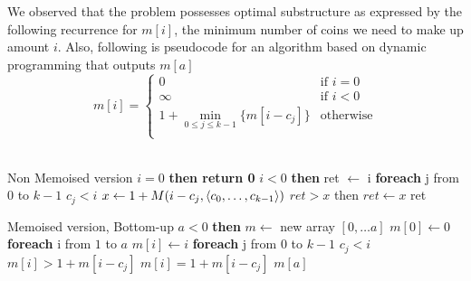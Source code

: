 \documentclass[10pt]{article}
\DeclarePairedDelimiter\angled{\langle}{\rangle}
\begin{document}
\begin{flushleft}
\begin{enumerate}[topsep=-10pt, itemsep=10pt]
    We observed that the problem possesses optimal substructure as expressed by the following recurrence for $m[i]$, the minimum number of coins we need to make up amount $i$. Also, following is pseudocode for an algorithm based on dynamic programming that outputs $m[a]$
    \[m[i] = \begin{cases} 
      0 & \text{if } i = 0 \\
      \infty & \text{if } i < 0 \\
      1 + \min\limits_{0\leq j \leq k-1}\{m[i-c_j]\} & \text{otherwise}\\
   \end{cases}
    \]\\
    \vspace{5mm}
    \begin{codebox}
    \li \Comment Non Memoised version
    \li \If $i = 0$ \textbf{then return 0}
    \li \If $i < 0$ \textbf{then} \Error
    \li ret $\leftarrow$ i
    \li \textbf{foreach} j from $0$ to $k-1$ \Do
    \li \If $c_j < i$ \Then
    \li $x \leftarrow 1 + M(i-c_j,\angled{c_0,\dots,c_{k-1}})$
    \li \If $ret > x$ then $ret \leftarrow x$
    \End
    \End
    \li \Return ret
    \end{codebox}
    \begin{codebox}
    \li \Comment Memoised version, Bottom-up
    \li \If $a < 0$ \textbf{then} \Error
    \li $m \leftarrow$ new array $[0, \dots a]$
    \li $m[0] \leftarrow 0$
    \li \textbf{foreach} i from $1$ to $a$ \Do
    \li $m[i] \leftarrow i$
    \li \textbf{foreach} j from $0$ to $k-1$ \Do
    \li \If $c_j < i$ \Then
    \li \If $m[i] > 1 + m[i - c_j]$ \Then
    \li $m[i] = 1 + m[i - c_j]$
    \End\End\End\End
    \li \Return $m[a]$

\end{codebox}
\end{enumerate}
\end{flushleft}
\end{document}
